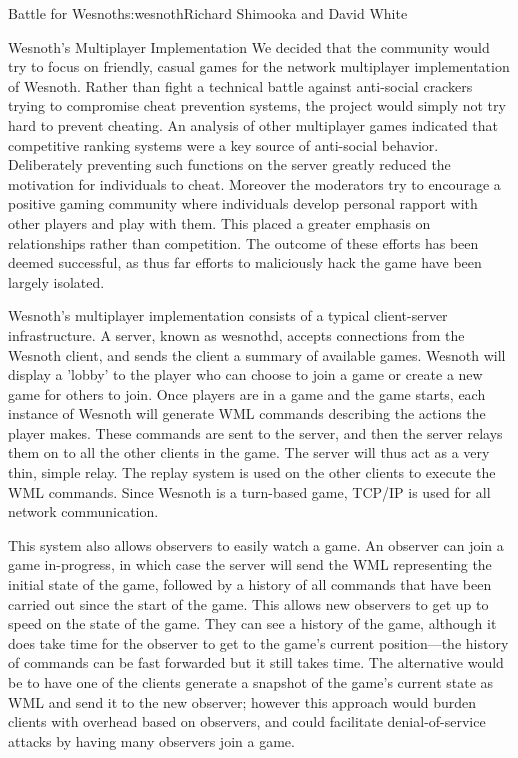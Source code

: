 \begin{aosachapter}{Battle for Wesnoth}{s:wesnoth}{Richard Shimooka and David White}
\begin{aosasect1}{Wesnoth's Multiplayer Implementation}
We decided that the community would try to focus on friendly, casual
games for the network multiplayer implementation of Wesnoth.  Rather
than fight a technical battle against anti-social crackers trying to
compromise cheat prevention systems, the project would simply not try
hard to prevent cheating. An analysis of other multiplayer games
indicated that competitive ranking systems were a key source of
anti-social behavior. Deliberately preventing such functions on the
server greatly reduced the motivation for individuals to cheat.
Moreover the moderators try to encourage a positive gaming community
where individuals develop personal rapport with other players and play
with them. This placed a greater emphasis on relationships rather than
competition. The outcome of these efforts has been deemed successful,
as thus far efforts to maliciously hack the game have been largely
isolated.

Wesnoth's multiplayer implementation consists of a typical
client-server infrastructure. A server, known as wesnothd, accepts
connections from the Wesnoth client, and sends the client a summary of
available games.  Wesnoth will display a 'lobby' to the player who can
choose to join a game or create a new game for others to join. Once
players are in a game and the game starts, each instance of Wesnoth
will generate WML commands describing the actions the player
makes. These commands are sent to the server, and then the server
relays them on to all the other clients in the game. The server will
thus act as a very thin, simple relay. The replay system is used on
the other clients to execute the WML commands.  Since Wesnoth is a
turn-based game, TCP/IP is used for all network communication.

This system also allows observers to easily watch a game. An observer
can join a game in-progress, in which case the server will send the
WML representing the initial state of the game, followed by a history
of all commands that have been carried out since the start of the
game. This allows new observers to get up to speed on the state of
the game. They can see a history of the game, although it does take
time for the observer to get to the game's current position---the
history of commands can be fast forwarded but it still takes
time. The alternative would be to have one of the clients generate a
snapshot of the game's current state as WML and send it to the new
observer; however this approach would burden clients with overhead
based on observers, and could facilitate denial-of-service attacks by
having many observers join a game.


\end{aosasect1}
\end{aosachapter}
